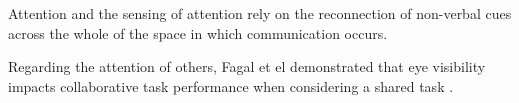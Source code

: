 Attention and the sensing of attention rely on the reconnection of non-verbal cues across the whole of the space in which communication occurs. \par%
Regarding the attention of others, Fagal et el demonstrated that eye visibility impacts collaborative task performance when considering a shared task \cite{Fagel2010}.\par
